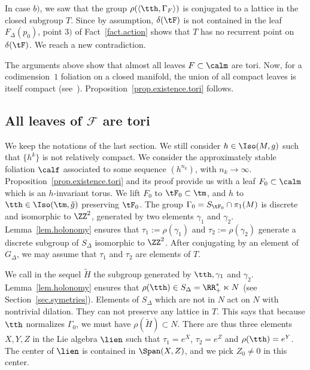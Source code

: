 In case $b)$, we saw that the group $\rho(\langle \tth,\Gamma_{F}\rangle )$ is conjugated to a lattice in the closed subgroup $T$. Since by assumption, $\delta(\tF)$ is not contained in the leaf $F_{\Delta}(p_0)$, point $3)$ of Fact~\ref{fact.action} shows that $T$ has no recurrent point on $\delta(\tF)$. We reach a new contradiction.


The arguments above show that almost all leaves $F \subset \calm$ are tori. Now, for a codimension~$1$ foliation on a closed manifold, the union of all compact leaves is itself compact (see~\cite[Chapter~II, Corollary~3.10]{godbillon}). Proposition~\ref{prop.existence.tori} follows.


\subsection{All leaves of \texorpdfstring{${\mathcal F}$}{F} are tori}

We keep the notations of the last section. We still consider $h \in \Iso(M,g)$ such that $\{ h^k \}$ is not relatively compact. We consider the approximately stable foliation $\calf$ associated to some sequence $(h^{n_k})$, with $n_k \to \infty$. Proposition~\ref{prop.existence.tori} and its proof provide us with a leaf $F_0 \subset \calm$ which is an $h$-invariant torus. We lift $F_0$ to $\tF_0 \subset \tm$, and $h$ to $\tth \in \Iso(\tm,\tilde{g})$ preserving $\tF_0$. The group $\Gamma_0=S_{\tF_0} \cap \pi_1(M)$ is discrete and isomorphic to $\ZZ^2$, generated by two elements $\gamma_1$ and $\gamma_2$. Lemma~\ref{lem.holonomy} ensures that $\tau_1:=\rho(\gamma_1)$ and $\tau_2:=\rho(\gamma_2)$ generate a discrete subgroup of $S_{\Delta}$ isomorphic to $\ZZ^2$. After conjugating by an element of $G_{\Delta}$, we may assume that $\tau_1$ and $\tau_2$ are elements of $T$.

We call in the sequel $\tilde{H}$ the subgroup generated by $\tth, \gamma_1$ and $\gamma_2$. Lemma~\ref{lem.holonomy} ensures that $\rho(\tth) \in S_{\Delta}=\RR_+^* \ltimes N$ (see Section~\ref{sec.symetries}). Elements of $S_{\Delta}$ which are not in $N$ act on $N$ with nontrivial dilation. They can not preserve any lattice in $T$. This says that because $\tth$ normalizes $\Gamma_0$, we must have $\rho(\tilde{H}) \subset N$. There are thus three elements $X,Y,Z$ in the Lie algebra $\lien$ such that $\tau_1=e^X$, $\tau_2=e^Z$ and $\rho(\tth)=e^Y$. The center of $\lien$ is contained in $\Span(X,Z)$, and we pick $Z_0 \not =0$ in this center.

